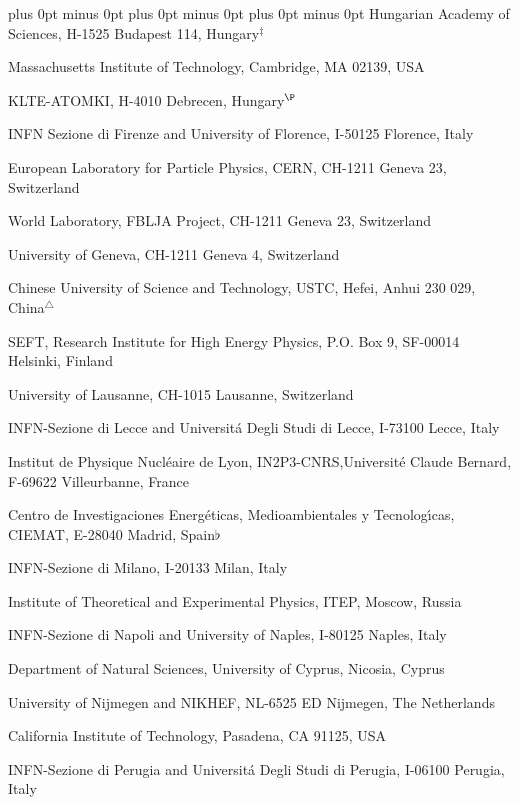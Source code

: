 \documentclass[12pt,a4paper,dvips]{article}
\begin{document}
{\begin{list}{A}{\itemsep=0pt plus 0pt minus 0pt\parsep=0pt plus 0pt minus 0pt
                \topsep=0pt plus 0pt minus 0pt}
     Hungarian Academy of Sciences, H-1525 Budapest 114, Hungary$^{\ddag}$
\item[\mit] Massachusetts Institute of Technology, Cambridge, MA 02139, USA
\item[\debrecen] KLTE-ATOMKI, H-4010 Debrecen, Hungary$^\P$
\item[\florence] INFN Sezione di Firenze and University of Florence, 
     I-50125 Florence, Italy
\item[\cern] European Laboratory for Particle Physics, CERN, 
     CH-1211 Geneva 23, Switzerland
\item[\wl] World Laboratory, FBLJA  Project, CH-1211 Geneva 23, Switzerland
\item[\geneva] University of Geneva, CH-1211 Geneva 4, Switzerland
\item[\hefei] Chinese University of Science and Technology, USTC,
      Hefei, Anhui 230 029, China$^{\triangle}$
\item[\seft] SEFT, Research Institute for High Energy Physics, P.O. Box 9,
      SF-00014 Helsinki, Finland
\item[\lausanne] University of Lausanne, CH-1015 Lausanne, Switzerland
\item[\lecce] INFN-Sezione di Lecce and Universit\'a Degli Studi di Lecce,
     I-73100 Lecce, Italy
\item[\lyon] Institut de Physique Nucl\'eaire de Lyon, 
     IN2P3-CNRS,Universit\'e Claude Bernard, 
     F-69622 Villeurbanne, France
\item[\madrid] Centro de Investigaciones Energ{\'e}ticas, 
     Medioambientales y Tecnolog{\'\i}cas, CIEMAT, E-28040 Madrid,
     Spain${\flat}$ 
\item[\milan] INFN-Sezione di Milano, I-20133 Milan, Italy
\item[\moscow] Institute of Theoretical and Experimental Physics, ITEP, 
     Moscow, Russia
\item[\naples] INFN-Sezione di Napoli and University of Naples, 
     I-80125 Naples, Italy
\item[\cyprus] Department of Natural Sciences, University of Cyprus,
     Nicosia, Cyprus
\item[\nymegen] University of Nijmegen and NIKHEF, 
     NL-6525 ED Nijmegen, The Netherlands
\item[\caltech] California Institute of Technology, Pasadena, CA 91125, USA
\item[\perugia] INFN-Sezione di Perugia and Universit\'a Degli 
     Studi di Perugia, I-06100 Perugia, Italy   

\end{list}}
\end{document}
